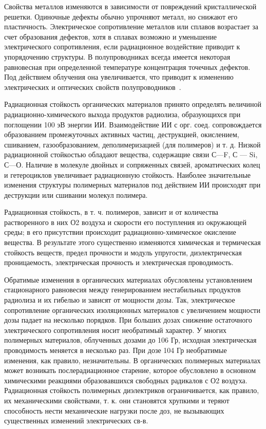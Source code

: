Свойства металлов изменяются в зависимости от повреждений кристаллической решетки. Одиночные дефекты обычно упрочняют металл, но снижают его пластичность. Электрическое сопротивление металлов или сплавов возрастает за счет образования дефектов, хотя в сплавах возможно и уменьшение электрического сопротивления, если радиационное воздействие приводит к упорядочению структуры. В полупроводниках всегда имеется некоторая равновесная при определенной температуре концентрация точечных дефектов. Под действием облучения она увеличивается, что приводит к изменению электрических и оптических свойств полупроводников~\cite{econ2}.

Радиационная стойкость органических материалов принято определять величиной радиационно-химического выхода продуктов радиолиза, образующихся при поглощении 100 эВ энергии ИИ. Взаимодействие ИИ с орг. соед. сопровождается образованием промежуточных активных частиц, деструкцией, окислением, сшиванием, газообразованием, деполимеризацией (для полимеров) и т. д. Низкой радиационной стойкостью обладают вещества, содержащие связи С—F, С — Si, С—О. Наличие в молекуле двойных и сопряженных связей, ароматических колец и гетероциклов увеличивает радиационную стойкость. Наиболее значительные изменения структуры полимерных материалов под действием ИИ происходят при деструкции или сшивании молекул полимера.

Радиационная стойкость, в т. ч. полимеров, зависит и от количества растворенного в них О2 воздуха и скорости его поступления из окружающей среды; в его присутствии происходит радиационно-химическое окисление вещества. В результате этого существенно изменяются химическая и термическая стойкость веществ, предел прочности и модуль упругости, диэлектрическая проницаемость, электрическая прочность и электрическая проводимость.

Обратимые изменения в органических материалах обусловлены установлением стационарного равновесия между генерированием нестабильных продуктов радиолиза и их гибелью и зависят от мощности дозы. Так, электрическое сопротивление органических изоляционных материалов с увеличением мощности дозы падает на несколько порядков. При больших дозах снижение остаточного электрического сопротивления носит необратимый характер. У многих полимерных материалов, облученных дозами до 106 Гр, исходная электрическая проводимость меняется в несколько раз. При дозе 104 Гр необратимые изменения, как правило, незначительны. В органических полимерных материалах может возникать послерадиационное старение, которое обусловлено в основном химическими реакциями образовавшихся свободных радикалов с О2 воздуха. Радиационная стойкость полимерных диэлектриков ограничивается, как правило, их механическими свойствами, т. к. они становятся хрупкими и теряют способность нести механические нагрузки после доз, не вызывающих существенных изменений электрических св-в.

